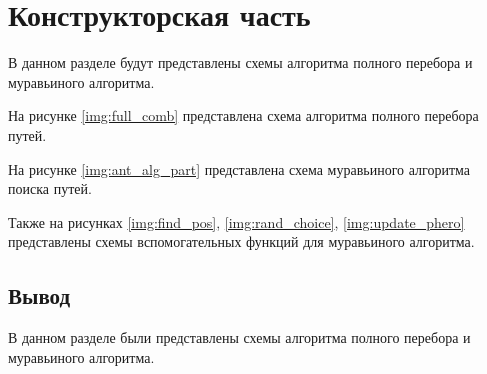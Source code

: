 
\chapter{Конструкторская часть}
В данном разделе будут представлены схемы алгоритма полного перебора и муравьиного алгоритма.

На рисунке \ref{img:full_comb} представлена схема алгоритма полного перебора путей.

\clearpage

На рисунке \ref{img:ant_alg_part} представлена схема муравьиного алгоритма поиска путей.

\clearpage
Также на рисунках \ref{img:find_pos}, \ref{img:rand_choice}, \ref{img:update_phero} представлены схемы вспомогательных функций для муравьиного алгоритма.


\clearpage
{}
\clearpage
{}


\section*{Вывод}
В данном разделе были представлены схемы алгоритма полного перебора и муравьиного алгоритма.